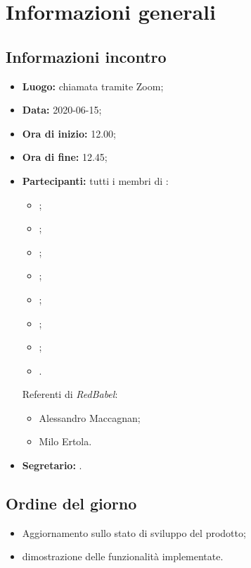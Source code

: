 \section{Informazioni generali}
\subsection{Informazioni incontro}
\begin{itemize}
	\item \textbf{Luogo:} chiamata tramite Zoom;
	\item \textbf{Data:} 2020-06-15;
	\item \textbf{Ora di inizio:} 12.00;
	\item \textbf{Ora di fine:} 12.45;
	\item \textbf{Partecipanti:}
		tutti i membri di \Gruppo:
		\begin{itemize}
			\item \VB;
			\item \LB;
			\item \NF;
			\item \EG;
			\item \FJ;
			\item \MP;
			\item \AS;
			\item \AZ.
		\end{itemize}
		
		Referenti di \textit{RedBabel}:
		\begin{itemize}
			\item Alessandro Maccagnan;
			\item Milo Ertola.
		\end{itemize}
	\item \textbf{Segretario:} \EG.
\end{itemize}

\subsection{Ordine del giorno}
\begin{itemize}
	\item Aggiornamento sullo stato di sviluppo del prodotto; 
	\item dimostrazione delle funzionalità implementate. 
\end{itemize}
